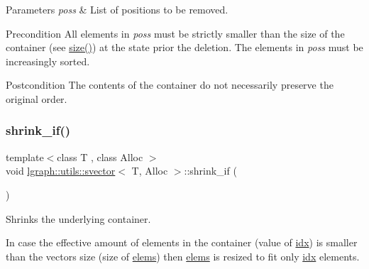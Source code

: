\begin{DoxyParams}{Parameters}
{\em poss} & List of positions to be removed. \\
\hline
\end{DoxyParams}
\begin{DoxyPrecond}{Precondition}
All elements in {\itshape poss} must be strictly smaller than the size of the container (see \hyperlink{classlgraph_1_1utils_1_1svector_af099aed6d134ad4c934be1339e4cf98c}{size()}) at the state prior the deletion. The elements in {\itshape poss} must be increasingly sorted. 
\end{DoxyPrecond}
\begin{DoxyPostcond}{Postcondition}
The contents of the container do not necessarily preserve the original order. 
\end{DoxyPostcond}
\mbox{\label{classlgraph_1_1utils_1_1svector_af9d5e3d01e8cf40b13494d699a7f2eef}} 
\subsubsection{\texorpdfstring{shrink\+\_\+if()}{shrink\_if()}}
{\footnotesize\ttfamily template$<$class T , class Alloc $>$ \\
void \hyperlink{classlgraph_1_1utils_1_1svector}{lgraph\+::utils\+::svector}$<$ T, Alloc $>$\+::shrink\+\_\+if (\begin{DoxyParamCaption}{ }\end{DoxyParamCaption})\hspace{0.3cm}{\ttfamily [private]}}



Shrinks the underlying container. 

In case the effective amount of elements in the container (value of \hyperlink{classlgraph_1_1utils_1_1svector_a7ef963c079c7dc8a6a559ceef81a241f}{idx}) is smaller than the vector\textquotesingle{}s size (size of \hyperlink{classlgraph_1_1utils_1_1svector_aa72e9ffeb58f88d3cb01671e3e672a45}{elems}) then \hyperlink{classlgraph_1_1utils_1_1svector_aa72e9ffeb58f88d3cb01671e3e672a45}{elems} is resized to fit only \hyperlink{classlgraph_1_1utils_1_1svector_a7ef963c079c7dc8a6a559ceef81a241f}{idx} elements. \mbox{\label{classlgraph_1_1utils_1_1svector_af099aed6d134ad4c934be1339e4cf98c}} 

